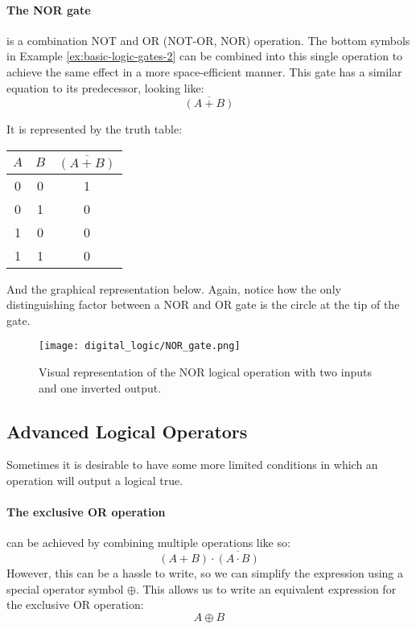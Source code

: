     \paragraph*{The NOR gate} is a combination NOT and OR (NOT-OR, NOR) operation.
    The bottom symbols in Example \ref{ex:basic-logic-gates-2} can be combined into this single operation to achieve the same effect in a more space-efficient manner.
    This gate has a similar equation to its predecessor, looking like:
    \begin{equation*}
        \overline{(A + B)}
    \end{equation*}

    It is represented by the truth table:
    \begin{table}[h!]
        \begin{tabular}{c c | c}
            \toprule
            $A$ & $B$ & $\overline{(A + B)}$  \\
            \midrule
             0  &  0  &    1    \\
             0  &  1  &    0    \\
             1  &  0  &    0    \\
             1  &  1  &    0    \\
            \bottomrule
        \end{tabular}
    \end{table}

    And the graphical representation below. 
    Again, notice how the only distinguishing factor between a NOR and OR gate is the circle at the tip of the gate.
    \begin{figure}[h!]
        \texttt{[image: digital\_logic/NOR\_gate.png]}
        \caption[NOR Gate]{Visual representation of the NOR logical operation with two inputs and one inverted output.}
    \end{figure}

    \subsection{Advanced Logical Operators}
    Sometimes it is desirable to have some more limited conditions in which an operation will output a logical true.
    
    \paragraph*{The exclusive OR operation} can be achieved by combining multiple operations like so:
    \begin{equation*}
        (A+B) \cdot \overline{(A \cdot B)}
    \end{equation*}
    However, this can be a hassle to write, so we can simplify the expression using a special operator symbol $\oplus$.
    This allows us to write an equivalent expression for the exclusive OR operation:
    \begin{equation*}
        A \oplus B
    \end{equation*}

